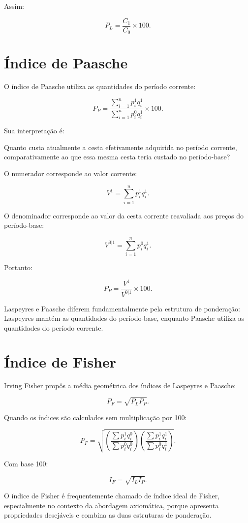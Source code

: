 Assim:

$$
P_L=
\frac{C_1}{C_0}\times100.
$$




\section{Índice de Paasche}

O índice de Paasche utiliza as quantidades do período corrente:

$$
P_P=
\frac{\sum_{i=1}^{n}p_i^1q_i^1}
{\sum_{i=1}^{n}p_i^0q_i^1}
\times100.
$$

Sua interpretação é:

Quanto custa atualmente a cesta efetivamente adquirida no período corrente, comparativamente ao que essa mesma cesta teria custado no período-base?

O numerador corresponde ao valor corrente:

$$
V^1=
\sum_{i=1}^{n}p_i^1q_i^1.
$$

O denominador corresponde ao valor da cesta corrente reavaliada aos preços do período-base:

$$
V^{0|1}=
\sum_{i=1}^{n}p_i^0q_i^1.
$$

Portanto:

$$
P_P=
\frac{V^1}{V^{0|1}}\times100.
$$

Laspeyres e Paasche diferem fundamentalmente pela estrutura de ponderação: Laspeyres mantém as quantidades do período-base, enquanto Paasche utiliza as quantidades do período corrente.



\section{Índice de Fisher}

Irving Fisher propôs a média geométrica dos índices de Laspeyres e Paasche:

$$
P_F=
\sqrt{P_LP_P}.
$$

Quando os índices são calculados sem multiplicação por 100:

$$
P_F=
\sqrt{
\left(
\frac{\sum p_i^1q_i^0}
{\sum p_i^0q_i^0}
\right)
\left(
\frac{\sum p_i^1q_i^1}
{\sum p_i^0q_i^1}
\right)
}.
$$

Com base 100:

$$
I_F=
\sqrt{I_LI_P}.
$$

O índice de Fisher é frequentemente chamado de índice ideal de Fisher, especialmente no contexto da abordagem axiomática, porque apresenta propriedades desejáveis e combina as duas estruturas de ponderação.